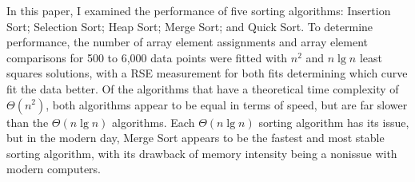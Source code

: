 \documentclass[10pt,fleqn]{article}
\begin{document}
In this paper, I examined the performance of five sorting algorithms: Insertion Sort; Selection Sort; Heap Sort; Merge Sort; and Quick Sort. To determine performance, the number of array element assignments and array element comparisons for 500 to 6,000 data points were fitted with $n^2$ and $n\lg n$ least squares solutions, with a RSE measurement for both fits determining which curve fit the data better. Of the algorithms that have a theoretical time complexity of $\Theta(n^2)$, both algorithms appear to be equal in terms of speed, but are far slower than the $\Theta(n\lg n)$ algorithms. Each $\Theta(n\lg n)$ sorting algorithm has its issue, but in the modern day, Merge Sort appears to be the fastest and most stable sorting algorithm, with its drawback of memory intensity being a nonissue with modern computers.



\end{document}
